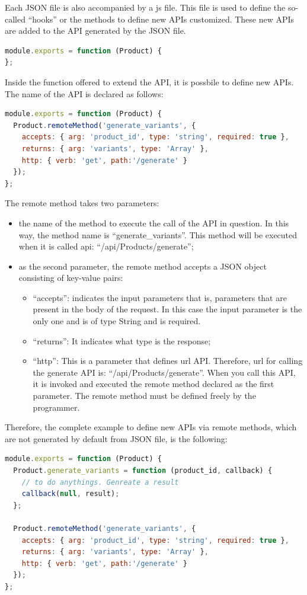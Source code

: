 Each JSON file is also accompanied by a js file. This file is used to define the so-called “hooks” or the methods to define new APIs customized. These new APIs are added to the API generated by the JSON file.
\begin{lstlisting}[language=javascript]
module.exports = function (Product) {
};
\end{lstlisting}
Inside the function offered to extend the API, it is possbile to define new APIs. The name of the API is declared as follows:
\begin{lstlisting}[language=javascript]
module.exports = function (Product) {
  Product.remoteMethod('generate_variants', {
    accepts: { arg: 'product_id', type: 'string', required: true },
    returns: { arg: 'variants', type: 'Array' },
    http: { verb: 'get', path:'/generate' }
  });
};
\end{lstlisting}
The remote method takes two parameters:
\begin{itemize}
\item the name of the method to execute the call of the API in question. In this way, the method name is “generate\_variants”. This method will be executed when it is called api: “/api/Products/generate”;
\item as the second parameter, the remote method accepts a JSON object consisting of key-value pairs:
\begin{itemize}
\item “accepts”: indicates the input parameters that is, parameters that are present in the body of the request. In this case the input parameter is the only one and is of type String and is required.
\item “returns”: It indicates what type is the response;
\item “http”: This is a parameter that defines url API. Therefore, url for calling the generate API is: “/api/Products/generate”. When you call this API, it is invoked and executed the remote method declared as the first parameter. The remote method must be defined freely by the programmer.
\end{itemize}
\end{itemize}
Therefore, the complete example to define new APIs via remote methods, which are not generated by default from JSON file, is the following:
\begin{lstlisting}[language=javascript]
module.exports = function (Product) {
  Product.generate_variants = function (product_id, callback) {
    // to do anythings. Genreate a result
    callback(null, result);
  };

  Product.remoteMethod('generate_variants', {
    accepts: { arg: 'product_id', type: 'string', required: true },
    returns: { arg: 'variants', type: 'Array' },
    http: { verb: 'get', path:'/generate' }
  });
};
\end{lstlisting}
